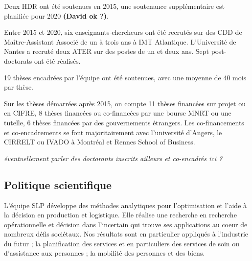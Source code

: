 Deux HDR ont été soutenues en 2015, une soutenance supplémentaire est planifiée pour 2020\textbf{ (David ok ?)}.

Entre 2015 et 2020,  six enseignants-chercheurs ont été recrutés sur des CDD de Maître-Assistant Associé de un à trois ans à IMT Atlantique. 
L'Université de Nantes a recruté deux ATER sur des postes de un et deux ans.
Sept post-doctorats ont été réalisés.

19 thèses encadrées par l'équipe ont été soutenues, avec une moyenne de 40 mois par thèse. 


Sur les thèses démarrées après 2015, on compte 11 thèses financées sur projet ou en CIFRE, 8 thèses financées ou co-financées par une bourse MNRT  ou une tutelle,
6 thèses financées par des gouvernements étrangers.
Les co-financements et co-encadrements se font majoritairement avec l'université d'Angers, le CIRRELT ou IVADO à Montréal et Rennes School of Business. 

\textit{ éventuellement parler des doctorants inscrits ailleurs et co-encadrés ici ?
}
\subsection{Politique scientifique}
  

L'équipe SLP développe des méthodes analytiques pour l'optimisation et l'aide à la décision en production et logistique. 
Elle réalise une recherche en recherche opérationnelle et décision dans l'incertain qui trouve ses applications au coeur de nombreux défis sociétaux.
Nos résultats sont en particulier appliqués à l'industrie du futur ; la planification des services et en particuliers des services de soin ou d'assistance aux personnes ; la mobilité des personnes et des biens.

